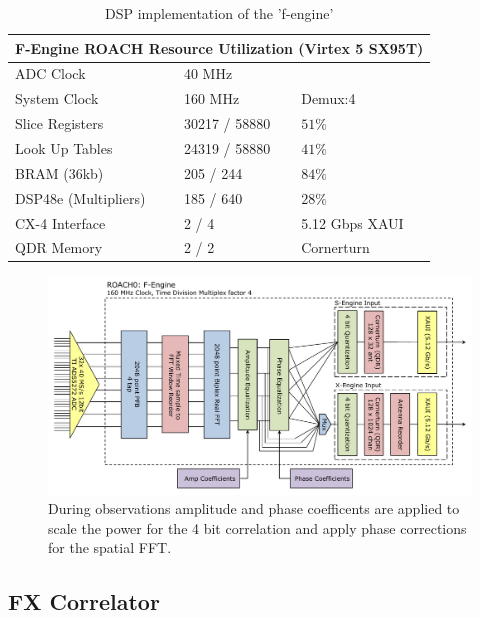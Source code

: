 \documentclass[useAMS,usenatbib,onecolumn]{mn2e}
\begin{document}
\begin{table}
\begin{center}
\begin{tabular}{| l | l | l |}
\hline
\multicolumn{3}{|c|}{F-Engine ROACH Resource Utilization (Virtex 5 SX95T)}\\
\hline
ADC Clock & 40 MHz \\
System Clock & 160 MHz & Demux:4 \\
Slice Registers & 30217 / 58880 & $51\%$\\
Look Up Tables & 24319 / 58880 & $41\%$\\
BRAM (36kb) & 205 / 244 & $84\%$\\
DSP48e (Multipliers) & 185 / 640 & $28\%$\\
CX-4 Interface & 2 / 4 & 5.12 Gbps XAUI\\
QDR Memory & 2 / 2 & Cornerturn\\
\hline
\end{tabular}
\caption{DSP implementation of the 'f-engine'}
\label{tbl:feng_resource}
\end{center}
\end{table}

\begin{figure}
    \centering
    \includegraphics[scale=0.6]{graphics/crop_fengine_block.pdf}
    \caption{During observations amplitude and phase coefficents are applied to scale the power for the 4 bit correlation and apply phase corrections for the spatial FFT.}
    \label{fig:feng_block}
\end{figure}

\subsection{FX Correlator}
\end{document}
